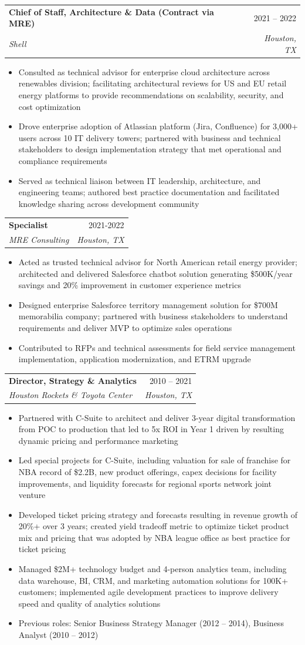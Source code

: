 \documentclass[letterpaper,11pt]{article}
\makeatletter
\newcommand{\resumeItem}[1]{
  \item\small{
    {#1 \vspace{-2pt}}
  }
}
\newcommand{\resumeSubheading}[4]{
  \vspace{-2pt}\item
    \begin{tabular*}{0.97\textwidth}[t]{l@{\extracolsep{\fill}}r}
      \textbf{#1} & #2 \\
      \textit{\small#3} & \textit{\small #4} \\
    \end{tabular*}\vspace{-7pt}
}
\newcommand{\resumeItemListStart}{\begin{itemize}}
\newcommand{\resumeItemListEnd}{\end{itemize}\vspace{-5pt}}
\makeatother
\begin{document}
    \resumeSubheading
      {Chief of Staff, Architecture \& Data (Contract via MRE)}{2021 -- 2022}
      {Shell}{Houston, TX}
      \resumeItemListStart
        \resumeItem{Consulted as technical advisor for enterprise cloud architecture across renewables division; facilitating architectural reviews for US and EU retail energy platforms to provide recommendations on scalability, security, and cost optimization}
        \resumeItem{Drove enterprise adoption of Atlassian platform (Jira, Confluence) for 3,000+ users across 10 IT delivery towers; partnered with business and technical stakeholders to design implementation strategy that met operational and compliance requirements}
        \resumeItem{Served as technical liaison between IT leadership, architecture, and engineering teams; authored best practice documentation and facilitated knowledge sharing across development community}
      \resumeItemListEnd

    \resumeSubheading
      {Specialist}{2021-2022}
      {MRE Consulting}{Houston, TX}
      \resumeItemListStart
        \resumeItem{Acted as trusted technical advisor for North American retail energy provider; architected and delivered Salesforce chatbot solution generating \$500K/year savings and 20\% improvement in customer experience metrics}
        \resumeItem{Designed enterprise Salesforce territory management solution for \$700M memorabilia company; partnered with business stakeholders to understand requirements and deliver MVP to optimize sales operations}
        \resumeItem{Contributed to RFPs and technical assessments for field service management implementation, application modernization, and ETRM upgrade}
      \resumeItemListEnd

    \resumeSubheading
      {Director, Strategy \& Analytics}{2010 -- 2021}
      {Houston Rockets \& Toyota Center}{Houston, TX}
      \resumeItemListStart
        \resumeItem{Partnered with C-Suite to architect and deliver 3-year digital transformation from POC to production that led to 5x ROI in Year 1 driven by resulting dynamic pricing and performance marketing}
        \resumeItem{Led special projects for C-Suite, including valuation for sale of franchise for NBA record of \$2.2B, new product offerings, capex decisions for facility improvements, and liquidity forecasts for regional sports network joint venture}
        \resumeItem{Developed ticket pricing strategy and forecasts resulting in revenue growth of 20\%+ over 3 years; created yield tradeoff metric to optimize ticket product mix and pricing that was adopted by NBA league office as best practice for ticket pricing}
        \resumeItem{Managed \$2M+ technology budget and 4-person analytics team, including data warehouse, BI, CRM, and marketing automation solutions for 100K+ customers; implemented agile development practices to improve delivery speed and quality of analytics solutions}
        \resumeItem{Previous roles: Senior Business Strategy Manager (2012 -- 2014), Business Analyst (2010 -- 2012)}
      \resumeItemListEnd
\end{document}

